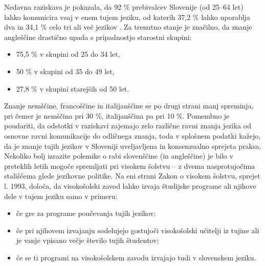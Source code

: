 \begin{multicols}{2}
Nedavna raziskava je pokazala, da 92 \% prebivalcev Slovenije (od 25--64 let) lahko komunicira vsaj v enem tujem jeziku, od katerih 37,2 \% lahko uporablja dva in 34,1 \% celo tri ali več jezikov \cite{SURS2}. Za trenutno stanje je značilno, da znanje angleščine drastično upada s pripadnostjo starostni skupini:
\begin{itemize}
\item 75,5 \% v skupini od 25 do 34 let, 
\item 50 \% v skupini od 35 do 49 let, 
\item 27,8 \% v skupini starejših od 50 let.
\end{itemize}
Znanje nemščine, francoščine in italijanščine se po drugi strani manj spreminja, pri čemer je nemščina pri 30 \%, italijanščina pa pri 10 \%. Pomembno je poudariti, da odstotki v raziskavi zajemajo zelo različne ravni znanja jezika od osnovne ravni komunikacije do odličnega znanja, toda v splošnem podatki kažejo, da je znanje tujih jezikov v Sloveniji uveljavljena in konsenzualno sprejeta praksa.
Nekoliko bolj izrazite polemike o rabi slovenščine (in angleščine) je bilo v preteklih letih mogoče sprem\-ljati pri visokem šolstvu – z dvema nasprotujočima stališ\-čema glede jezikovne politike. Na eni strani Zakon o visokem šolstvu, sprejet l. 1993, določa, da visokošolski zavod lahko izvaja študijske programe ali njihove dele v tujem jeziku samo v primeru:
\begin{itemize}
\item če gre za programe poučevanja tujih jezikov;
\item če pri njihovem izvajanju sodelujejo gostujoči visokošolski učitelji iz tujine ali je vanje vpisano večje število tujih študentov;
\item če se ti programi na visokošolskem zavodu izvajajo tudi v slovenskem jeziku.
\end{itemize}



\end{multicols}
